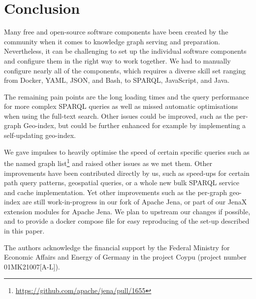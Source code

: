 \documentclass[
hf
]{ceurart}
\begin{document}
\section{Conclusion}

Many free and open-source software components have been created by the community when it comes to knowledge graph serving and preparation. Nevertheless, it can be challenging to set up the individual software components and configure them in the right way to work together. We had to manually configure nearly all of the components, which requires a diverse skill set ranging from Docker, YAML, JSON, and Bash, to SPARQL, JavaScript, and Java. 

The remaining pain points are the long loading times and the query performance for more complex SPARQL queries as well as missed automatic optimisations when using the full-text search. Other issues could be improved, such as the per-graph Geo-index, but could be further enhanced for example by implementing a self-updating geo-index.

We gave impulses to heavily optimise the speed of certain specific queries such as the named graph list\footnote{\url{https://github.com/apache/jena/pull/1655}} and raised other issues as we met them. Other improvements have been contributed directly by us, such as speed-ups for certain path query patterns, geospatial queries, or a whole new bulk SPARQL service and cache implementation. Yet other improvements such as the per-graph geo-index are still work-in-progress in our fork of Apache Jena, or part of our JenaX extension modules for Apache Jena. We plan to upstream our changes if possible, and to provide a docker compose file for easy reproducing of the set-up described in this paper.

\begin{acknowledgments}
The authors acknowledge the financial support by the Federal Ministry for Economic Affairs and Energy of Germany in the project Coypu (project number 01MK21007[A-L]).
\end{acknowledgments}

{%
}
\clearpage
\end{document}
